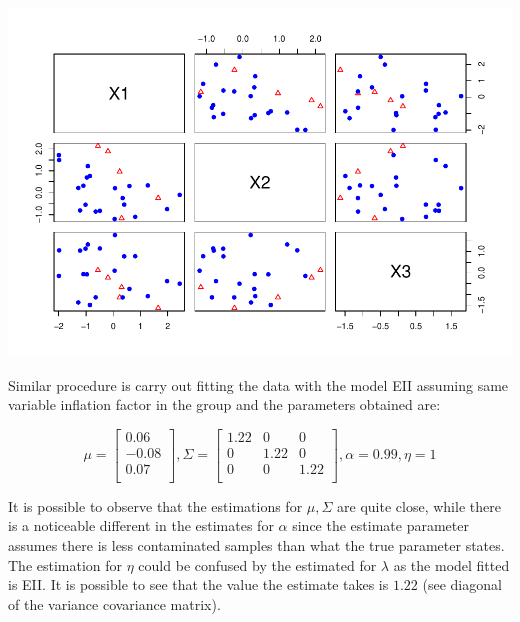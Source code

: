 \documentclass[
]{article}
\newenvironment{Shaded}{\begin{snugshade}}{\end{snugshade}}
\newcommand{\AttributeTok}[1]{\textcolor[rgb]{0.77,0.63,0.00}{#1}}
\newcommand{\DecValTok}[1]{\textcolor[rgb]{0.00,0.00,0.81}{#1}}
\newcommand{\FunctionTok}[1]{\textcolor[rgb]{0.00,0.00,0.00}{#1}}
\newcommand{\NormalTok}[1]{#1}
\newcommand{\SpecialCharTok}[1]{\textcolor[rgb]{0.00,0.00,0.00}{#1}}
\newcommand{\StringTok}[1]{\textcolor[rgb]{0.31,0.60,0.02}{#1}}
\begin{document}
\begin{Shaded}
\end{Shaded}

\includegraphics{DifferentVarInflationFactors_files/figure-latex/plotB_test-1.pdf}

Similar procedure is carry out fitting the data with the model EII
assuming same variable inflation factor in the group and the parameters
obtained are:

\[
\mu = \begin{bmatrix}0.06 \\-0.08 \\0.07 \\\end{bmatrix} , \Sigma = \begin{bmatrix}1.22&0&0 \\0&1.22&0 \\0&0&1.22 \\\end{bmatrix}, \alpha = 0.99 , \eta = 1
\]

It is possible to observe that the estimations for \(\mu,\Sigma\) are
quite close, while there is a noticeable different in the estimates for
\(\alpha\) since the estimate parameter assumes there is less
contaminated samples than what the true parameter states. The estimation
for \(\eta\) could be confused by the estimated for \(\lambda\) as the
model fitted is EII. It is possible to see that the value the estimate
takes is \(1.22\) (see diagonal of the variance covariance matrix).
\end{document}

